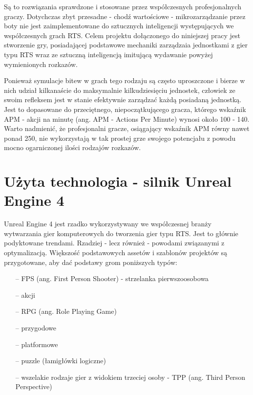 \documentclass[12pt]{report}
\begin{document}
Są to rozwiązania sprawdzone i stosowane przez współczesnych profesjonalnych graczy. Dotychczas zbyt przesadne - chodź wartościowe - mikrozarządzanie przez boty nie jest zaimplementowane do sztucznych inteligencji występujących we współczesnych grach  RTS. Celem projektu dołączonego do niniejszej pracy jest stworzenie gry, posiadającej podstawowe mechaniki zarządzaia jednostkami z gier typu RTS wraz ze sztuczną inteligencją imitującą wydawanie powyżej wymienionych rozkazów.


Ponieważ symulacje bitew w grach tego rodzaju są często uproszczone i bierze w nich udział kilkanaście do maksymalnie kilkudziesięciu jednostek, człowiek ze swoim refleksem jest w stanie efektywnie zarządzać każdą posiadaną jednostką. Jest to dopasowane do przeciętnego, niepoczątkującego gracza, którego wskaźnik APM - akcji na minutę (ang. APM - Actions Per Minute) wynosi około 100 - 140. Warto nadmienić, że profesjonalni gracze, osiągający wskaźnik APM równy nawet ponad 250, nie wykorzystają w tak prostej grze swojego potencjału z powodu mocno ogarniczonej ilości rodzajów rozkazów.




\chapter{Użyta technologia - silnik Unreal Engine 4}

Unreal Engine 4 jest rzadko wykorzystywany we współczesnej branży wytwarzania gier komputerowych do tworzenia gier typu RTS. Jest to głównie podyktowane trendami. Rzadziej - lecz również - powodami związanymi z optymalizacją. Większość podstawowych assetów i szablonów projektów są przygotowane, aby dać podstawy grom poniższych typów:
\begin{itemize}
\item[--] FPS (ang. First Person Shooter) - strzelanka pierwszoosobowa
\item[--] akcji
\item[--] RPG (ang. Role Playing Game)
\item[--] przygodowe
\item[--] platformowe
\item[--] puzzle (łamigłówki logiczne)
\item[--] wszelakie rodzaje gier z widokiem trzeciej osoby - TPP (ang. Third Person Perspective)  
\end{itemize}
\end{document}
